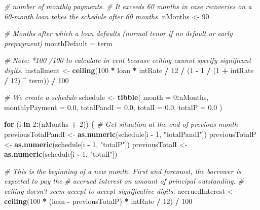 \documentclass[11pt,]{report}
\newenvironment{Shaded}{\begin{snugshade}}{\end{snugshade}}
\newcommand{\CommentTok}[1]{\textcolor[rgb]{0.56,0.35,0.01}{\textit{#1}}}
\newcommand{\ControlFlowTok}[1]{\textcolor[rgb]{0.13,0.29,0.53}{\textbf{#1}}}
\newcommand{\DataTypeTok}[1]{\textcolor[rgb]{0.13,0.29,0.53}{#1}}
\newcommand{\DecValTok}[1]{\textcolor[rgb]{0.00,0.00,0.81}{#1}}
\newcommand{\FloatTok}[1]{\textcolor[rgb]{0.00,0.00,0.81}{#1}}
\newcommand{\KeywordTok}[1]{\textcolor[rgb]{0.13,0.29,0.53}{\textbf{#1}}}
\newcommand{\NormalTok}[1]{#1}
\newcommand{\OperatorTok}[1]{\textcolor[rgb]{0.81,0.36,0.00}{\textbf{#1}}}
\newcommand{\StringTok}[1]{\textcolor[rgb]{0.31,0.60,0.02}{#1}}
\begin{document}
\begin{Shaded}
\begin{Highlighting}[numbers=left,,]
  \CommentTok{# number of monthly payments.}
  \CommentTok{# It exceeds 60 months in case recoveries on a 60-month loan takes the schedule after 60 months.}
\NormalTok{  nMonths <-}\StringTok{ }\DecValTok{90}
  
  \CommentTok{# Months after which a loan defaults (normal tenor if no default or early prepayment)}
\NormalTok{  monthDefault =}\StringTok{ }\NormalTok{term}
  
  \CommentTok{# Note: *100 /100 to calculate in cent because ceiling cannot specify significant digits.}
\NormalTok{  installment <-}
\StringTok{    }\KeywordTok{ceiling}\NormalTok{(}\DecValTok{100} \OperatorTok{*}\StringTok{ }\NormalTok{loan }\OperatorTok{*}\StringTok{ }\NormalTok{intRate }\OperatorTok{/}\StringTok{ }\DecValTok{12} \OperatorTok{/}\StringTok{ }\NormalTok{(}\DecValTok{1} \OperatorTok{-}\StringTok{ }\DecValTok{1} \OperatorTok{/}\StringTok{ }\NormalTok{(}\DecValTok{1} \OperatorTok{+}\StringTok{ }\NormalTok{intRate }\OperatorTok{/}\StringTok{ }\DecValTok{12}\NormalTok{) }\OperatorTok{^}\StringTok{ }\NormalTok{term)) }\OperatorTok{/}\StringTok{ }\DecValTok{100}
  
  \CommentTok{# We create a schedule}
\NormalTok{  schedule <-}\StringTok{ }\KeywordTok{tibble}\NormalTok{(}
    \DataTypeTok{month =} \DecValTok{0}\OperatorTok{:}\NormalTok{nMonths,}
    \DataTypeTok{monthlyPayment =} \FloatTok{0.0}\NormalTok{,}
    \DataTypeTok{totalPandI =} \FloatTok{0.0}\NormalTok{,}
    \DataTypeTok{totalI =} \FloatTok{0.0}\NormalTok{,}
    \DataTypeTok{totalP =} \FloatTok{0.0}
\NormalTok{  )}
  
  \ControlFlowTok{for}\NormalTok{ (i }\ControlFlowTok{in} \DecValTok{2}\OperatorTok{:}\NormalTok{(nMonths }\OperatorTok{+}\StringTok{ }\DecValTok{2}\NormalTok{)) \{}
    \CommentTok{# Get situation at the end of previous month}
\NormalTok{    previousTotalPandI <-}\StringTok{ }\KeywordTok{as.numeric}\NormalTok{(schedule[i }\OperatorTok{-}\StringTok{ }\DecValTok{1}\NormalTok{, }\StringTok{"totalPandI"}\NormalTok{])}
\NormalTok{    previousTotalP     <-}\StringTok{ }\KeywordTok{as.numeric}\NormalTok{(schedule[i }\OperatorTok{-}\StringTok{ }\DecValTok{1}\NormalTok{, }\StringTok{"totalP"}\NormalTok{])}
\NormalTok{    previousTotalI     <-}\StringTok{ }\KeywordTok{as.numeric}\NormalTok{(schedule[i }\OperatorTok{-}\StringTok{ }\DecValTok{1}\NormalTok{, }\StringTok{"totalI"}\NormalTok{])}
    
    \CommentTok{# This is the beginning of a new month. First and foremost, the borrower is expected to pay the}
    \CommentTok{# accrued interest on amount of principal outstanding.}
    \CommentTok{# ceiling doesn't seem accept to accept significative digits.}
\NormalTok{    accruedInterest <-}
\StringTok{      }\KeywordTok{ceiling}\NormalTok{(}\DecValTok{100} \OperatorTok{*}\StringTok{ }\NormalTok{(loan }\OperatorTok{-}\StringTok{ }\NormalTok{previousTotalP) }\OperatorTok{*}\StringTok{ }\NormalTok{intRate }\OperatorTok{/}\StringTok{ }\DecValTok{12}\NormalTok{) }\OperatorTok{/}\StringTok{ }\DecValTok{100}
    

\end{Highlighting}
\end{Shaded}
\end{document}
